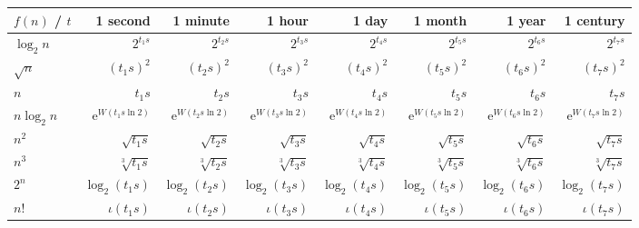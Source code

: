 \documentclass[12pt]{article}
\newcommand{\euler}{\mathrm{e}}
\begin{document}
\begin{table}[htbp]
    \renewcommand{\arraystretch}{1.2}
    \setlength{\tabcolsep}{7pt}
    \centering
    \begin{tabular}{l*{7}{r}}
        \toprule
            $f(n)$ / $t$ & 1 second & 1 minute & 1 hour & 1 day & 1 month & 1 year & 1 century \\ \midrule
            $\log_{2} n$ & $2^{t_{1} s}$ & $2^{t_{2} s}$ & $2^{t_{3} s}$ & $2^{t_{4} s}$ & $2^{t_{5} s}$ & $2^{t_{6} s}$ & $2^{t_{7} s}$ \\
            $\sqrt{n}$ & $(t_{1} s)^{2}$ & $(t_{2} s)^{2}$ & $(t_{3} s)^{2}$ & $(t_{4} s)^{2}$ & $(t_{5} s)^{2}$ & $(t_{6} s)^{2}$ & $(t_{7} s)^{2}$ \\
            $n$ & $t_{1} s$ & $t_{2} s$ & $t_{3} s$ & $t_{4} s$ & $t_{5} s$ & $t_{6} s$ & $t_{7} s$ \\
            $n \log_{2} n$ & $\euler^{W(t_{1} s \ln 2)}$ & $\euler^{W(t_{2} s \ln 2)}$ & $\euler^{W(t_{3} s \ln 2)}$ & $\euler^{W(t_{4} s \ln 2)}$ & $\euler^{W(t_{5} s \ln 2)}$ & $\euler^{W(t_{6} s \ln 2)}$ & $\euler^{W(t_{7} s \ln 2)}$ \\
            $n^{2}$ & $\sqrt{t_{1} s}$ & $\sqrt{t_{2} s}$ & $\sqrt{t_{3} s}$ & $\sqrt{t_{4} s}$ & $\sqrt{t_{5} s}$ & $\sqrt{t_{6} s}$ & $\sqrt{t_{7} s}$ \\
            $n^{3}$ & $\sqrt[3]{t_{1} s}$ & $\sqrt[3]{t_{2} s}$ & $\sqrt[3]{t_{3} s}$ & $\sqrt[3]{t_{4} s}$ & $\sqrt[3]{t_{5} s}$ & $\sqrt[3]{t_{6} s}$ & $\sqrt[3]{t_{7} s}$ \\
            $2^{n}$ & $\log_{2}(t_{1} s)$ & $\log_{2}(t_{2} s)$ & $\log_{2}(t_{3} s)$ & $\log_{2}(t_{4} s)$ & $\log_{2}(t_{5} s)$ & $\log_{2}(t_{6} s)$ & $\log_{2}(t_{7} s)$ \\
            $n!$ & $\iota(t_{1} s)$ & $\iota(t_{2} s)$ & $\iota(t_{3} s)$ & $\iota(t_{4} s)$ & $\iota(t_{5} s)$ & $\iota(t_{6} s)$ & $\iota(t_{7} s)$ \\
        \bottomrule
    \end{tabular}
\end{table}


{\footnotesize
}
\end{document}
